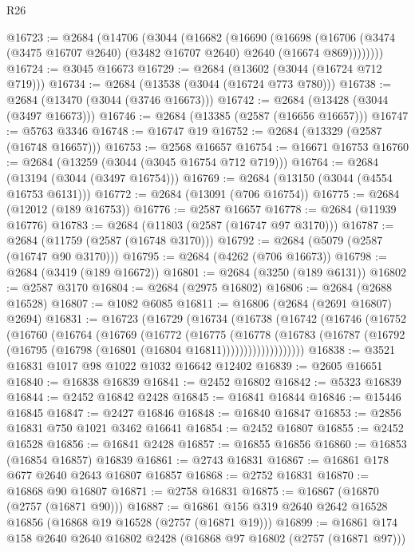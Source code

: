 \begin{lexlean}{R26}
\begin{coremodule}
@16723 := @2684
    (@14706
      (@3044
        (@16682
          (@16690
            (@16698
              (@16706 (@3474 (@3475 @16707 @2640) (@3482 @16707 @2640) @2640 (@16674 @869))))))))
@16724 := @3045 @16673
@16729 := @2684 (@13602 (@3044 (@16724 @712 @719)))
@16734 := @2684 (@13538 (@3044 (@16724 @773 @780)))
@16738 := @2684 (@13470 (@3044 (@3746 @16673)))
@16742 := @2684 (@13428 (@3044 (@3497 @16673)))
@16746 := @2684 (@13385 (@2587 (@16656 @16657)))
@16747 := @5763 @3346
@16748 := @16747 @19
@16752 := @2684 (@13329 (@2587 (@16748 @16657)))
@16753 := @2568 @16657
@16754 := @16671 @16753
@16760 := @2684 (@13259 (@3044 (@3045 @16754 @712 @719)))
@16764 := @2684 (@13194 (@3044 (@3497 @16754)))
@16769 := @2684 (@13150 (@3044 (@4554 @16753 @6131)))
@16772 := @2684 (@13091 (@706 @16754))
@16775 := @2684 (@12012 (@189 @16753))
@16776 := @2587 @16657
@16778 := @2684 (@11939 @16776)
@16783 := @2684 (@11803 (@2587 (@16747 @97 @3170)))
@16787 := @2684 (@11759 (@2587 (@16748 @3170)))
@16792 := @2684 (@5079 (@2587 (@16747 @90 @3170)))
@16795 := @2684 (@4262 (@706 @16673))
@16798 := @2684 (@3419 (@189 @16672))
@16801 := @2684 (@3250 (@189 @6131))
@16802 := @2587 @3170
@16804 := @2684 (@2975 @16802)
@16806 := @2684 (@2688 @16528)
@16807 := @1082 @6085
@16811 := @16806 (@2684 (@2691 @16807) @2694)
@16831 := @16723
    (@16729
      (@16734
        (@16738
          (@16742
            (@16746
              (@16752
                (@16760
                  (@16764
                    (@16769
                      (@16772
                        (@16775
                          (@16778
                            (@16783
                              (@16787
                                (@16792 (@16795 (@16798 (@16801 (@16804 @16811)))))))))))))))))))
@16838 := @3521 @16831 @1017 @98 @1022 @1032 @16642 @12402
@16839 := @2605 @16651
@16840 := @16838 @16839
@16841 := @2452 @16802
@16842 := @5323 @16839
@16844 := @2452 @16842 @2428
@16845 := @16841 @16844
@16846 := @15446 @16845
@16847 := @2427 @16846
@16848 := @16840 @16847
@16853 := @2856 @16831 @750 @1021 @3462 @16641
@16854 := @2452 @16807
@16855 := @2452 @16528
@16856 := @16841 @2428
@16857 := @16855 @16856
@16860 := @16853 (@16854 @16857) @16839
@16861 := @2743 @16831
@16867 := @16861 @178 @677 @2640 @2643 @16807 @16857
@16868 := @2752 @16831
@16870 := @16868 @90 @16807
@16871 := @2758 @16831
@16875 := @16867 (@16870 (@2757 (@16871 @90)))
@16887 := @16861 @156 @319 @2640 @2642 @16528 @16856 (@16868 @19 @16528 (@2757 (@16871 @19)))
@16899 := @16861 @174 @158 @2640 @2640 @16802 @2428 (@16868 @97 @16802 (@2757 (@16871 @97)))

\end{coremodule}
\end{lexlean}
